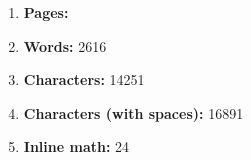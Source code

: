 \begin{enumerate}[itemsep = 0.1 pt]

      \item{
            \textbf{Pages:} 
            }




      \item{
            \textbf{Words:} 2616
            }

      \item{
            \textbf{Characters:} 14251
            }
      \item{
            \textbf{Characters (with spaces):} 16891
            }
      \item{
            \textbf{Inline math:} 24
            }

\end{enumerate}